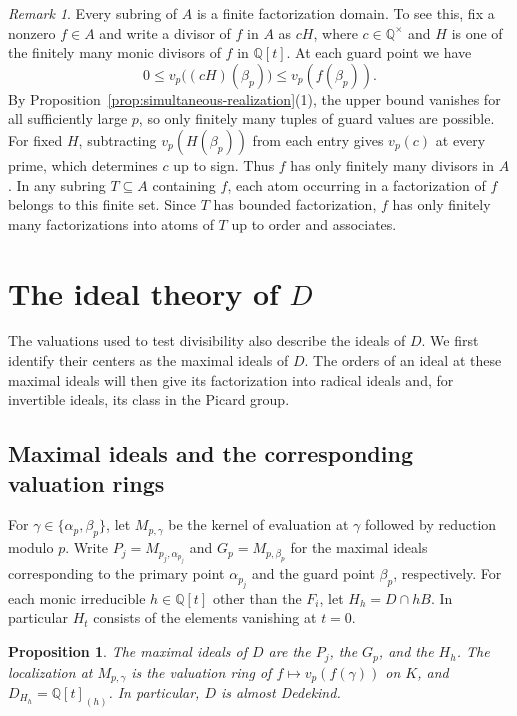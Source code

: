\documentclass{article}
\newtheorem{proposition}{Proposition}[section]
\theoremstyle{remark}
\newtheorem*{remark}{Remark}
\begin{document}
\begin{remark}
    Every subring of $A$ is a finite factorization domain.
    To see this, fix a nonzero $f \in A$ and write a divisor of $f$ in $A$ as $cH$, where $c \in \mathbb{Q}^\times$ and $H$ is one of the finitely many monic divisors of $f$ in $\mathbb{Q}[t]$.
    At each guard point we have
    \[
        0 \le v_p\bigl((cH)(\beta_p)\bigr) \le v_p(f(\beta_p)).
    \]
    By Proposition~\ref{prop:simultaneous-realization}(1), the upper bound vanishes for all sufficiently large $p$, so only finitely many tuples of guard values are possible.
    For fixed $H$, subtracting $v_p(H(\beta_p))$ from each entry gives $v_p(c)$ at every prime, which determines $c$ up to sign.
    Thus $f$ has only finitely many divisors in $A$.
    In any subring $T \subseteq A$ containing $f$, each atom occurring in a factorization of $f$ belongs to this finite set.
    Since $T$ has bounded factorization, $f$ has only finitely many factorizations into atoms of $T$ up to order and associates.
\end{remark}

\section{The ideal theory of \texorpdfstring{$D$}{D}}
\label{sec:ideal-theory}

The valuations used to test divisibility also describe the ideals of $D$.
We first identify their centers as the maximal ideals of $D$.
The orders of an ideal at these maximal ideals will then give its factorization into radical ideals and, for invertible ideals, its class in the Picard group.

\subsection{Maximal ideals and the corresponding valuation rings}

For $\gamma \in \{\alpha_p, \beta_p\}$, let $M_{p, \gamma}$ be the kernel of evaluation at $\gamma$ followed by reduction modulo $p$.
Write $P_j = M_{p_j, \alpha_{p_j}}$ and $G_p = M_{p, \beta_p}$ for the maximal ideals corresponding to the primary point $\alpha_{p_j}$ and the guard point $\beta_p$, respectively.
For each monic irreducible $h \in \mathbb{Q}[t]$ other than the $F_i$, let $H_h = D \cap hB$.
In particular $H_t$ consists of the elements vanishing at $t = 0$.

\begin{proposition}
    \label{prop:maximal-ideals-D}
    The maximal ideals of $D$ are the $P_j$, the $G_p$, and the $H_h$.
    The localization at $M_{p, \gamma}$ is the valuation ring of $f \mapsto v_p(f(\gamma))$ on $K$, and $D_{H_h} = \mathbb{Q}[t]_{(h)}$.
    In particular, $D$ is almost Dedekind.
\end{proposition}
\end{document}
